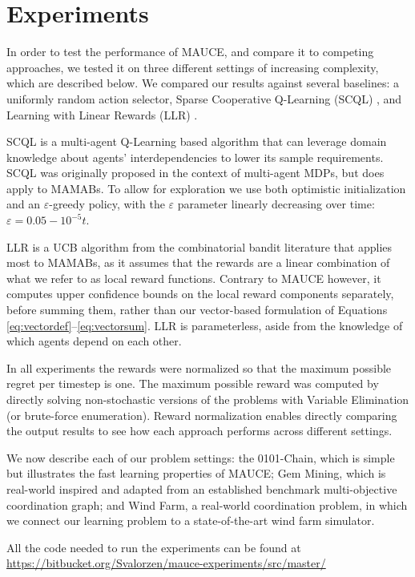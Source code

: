 \section{Experiments}
\label{sec:exp}

In order to test the performance of MAUCE, and compare it to competing approaches, we tested it on
three different settings of increasing complexity, which are described below. We compared our
results against several baselines: a uniformly random action selector, Sparse Cooperative Q-Learning
(SCQL) \cite{KokVlassis06}, and Learning with Linear Rewards (LLR) \cite{gai2012combinatorial}.

SCQL is a multi-agent Q-Learning based algorithm that can leverage domain knowledge about agents'
interdependencies to lower its sample requirements. SCQL was originally proposed in the context of
multi-agent MDPs, but does apply to MAMABs. To allow for exploration we use both optimistic
initialization and an $\varepsilon$-greedy policy, with the $\varepsilon$ parameter linearly decreasing over
time: $\varepsilon = 0.05 - 10^{-5} t$.

LLR is a UCB algorithm from the combinatorial bandit literature that applies most to MAMABs, as it
assumes that the rewards are a linear combination of what we refer to as local reward functions.
Contrary to MAUCE however, it computes upper confidence bounds on the local reward components
separately, before summing them, rather than our vector-based formulation of Equations
\ref{eq:vectordef}--\ref{eq:vectorsum}. LLR is parameterless, aside from the knowledge of which
agents depend on each other.

In all experiments the rewards were normalized so that the maximum possible regret per timestep is
one. The maximum possible reward was computed by directly solving non-stochastic versions of the
problems with Variable Elimination (or brute-force enumeration). Reward normalization enables
directly comparing the output results to see how each approach performs across different settings.

We now describe each of our problem settings: the 0101-Chain, which is simple but illustrates the
fast learning properties of MAUCE; Gem Mining, which is real-world inspired and adapted from an
established benchmark multi-objective coordination graph; and Wind Farm, a real-world coordination
problem, in which we connect our learning problem to a state-of-the-art wind farm simulator.

All the code needed to run the experiments can be found at
\url{https://bitbucket.org/Svalorzen/mauce-experiments/src/master/}

